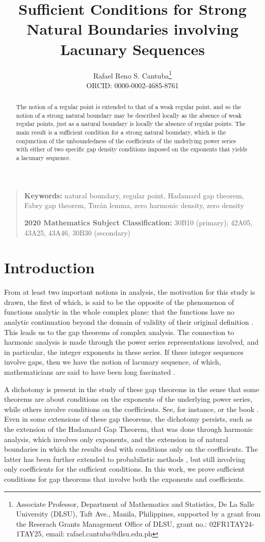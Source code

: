 \documentclass[11pt,a4paper]{article}
\title{Sufficient Conditions for Strong Natural Boundaries involving Lacunary Sequences}
\author{Rafael Reno S. Cantuba\thanks{Associate Professor, Department of Mathematics and Statistics, De La Salle University (DLSU), Taft Ave., Manila, Philippines, supported by a grant from the Reserach Grants Management Office of DLSU, grant no.: 02FR1TAY24-1TAY25, email: rafael.cantuba@dlsu.edu.ph}\\ ORCID: 0000-0002-4685-8761\orcidlink{0000-0002-4685-8761}}
\date{}
\begin{document}
\maketitle

\begin{abstract} The notion of a regular point is extended to that of a weak regular point, and so the notion of a strong natural boundary may be described locally as the absence of weak regular points, just as a natural boundary is locally the absence of regular points. The main result is a sufficient condition for a strong natural boundary, which is the conjunction of the unboundedness of the coefficients of the underlying power series with either of two specific gap density conditions imposed on the exponents that yields a lacunary sequence.
\end{abstract}

\vspace{0.5em}
\noindent
\begin{quote}
    \small
    \textbf{Keywords:} natural boundary, regular point, Hadamard gap theorem, Fabry gap theorem, Tur\'an lemma, zero harmonic density, zero density
    
    \vspace{0.5em}
    \textbf{2020 Mathematics Subject Classification:} 30B10 (primary);   42A05, 43A25, 43A46, 30B30 (secondary)
\end{quote}

\section{Introduction}

From at least two important notions in analysis, the motivation for this study is drawn, the first of which, is said to be the opposite of the phenomenon of functions analytic in the whole complex plane: that the functions have no analytic continuation beyond the domain of validity of their original definition \cite[p.~189]{seg08}. This leads us to the gap theorems of complex analysis. The connection to harmonic analysis is made through the power series representations involved, and in particular, the integer exponents in these series. If these integer sequences involve gaps, then we have the notion of lacunary sequence, of which, mathematicians are said to have been long fascinated \cite[p.~1]{gra13}.

A dichotomy is present in the study of these gap theorems in the sense that some theorems are about conditions on the exponents of the underlying power series, while others involve conditions on the coefficients. See, for instance, \cite[Chapter~6]{seg08} or the book \cite{sha68}. Even in some extensions of these gap theorems, the dichotomy persists, such as the extension \cite[Proposition~10.4.7]{gra13} of the Hadamard Gap Theorem, that was done through harmonic analysis, which involves only exponents, and the extension in \cite{bre11} of natural boundaries in which the results deal with conditions only on the coefficients. The latter has been further extended to probabilistic methods \cite{dos26}, but still involving only coefficients for the sufficient conditions. In this work, we prove sufficient conditions for gap theorems that involve both the exponents and coefficients.
\end{document}
